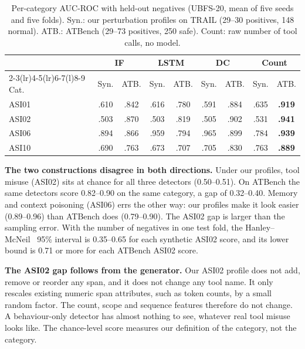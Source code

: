 \documentclass[conference]{IEEEtran}
\begin{document}
\begin{table}[t]
\caption{Per-category AUC-ROC with held-out negatives (UBFS-20, mean of five seeds and five folds). Syn.: our perturbation profiles on TRAIL (29--30 positives, 148 normal). ATB.: ATBench (29--73 positives, 250 safe). Count: raw number of tool calls, no model.}
\label{tab:construction}
\centering
\footnotesize
\setlength{\tabcolsep}{3pt}
\begin{tabular}{@{}l cc cc cc cc@{}}
\toprule
& \multicolumn{2}{c}{IF} & \multicolumn{2}{c}{LSTM} & \multicolumn{2}{c}{DC} & \multicolumn{2}{c}{Count} \\
\cmidrule(lr){2-3}\cmidrule(lr){4-5}\cmidrule(lr){6-7}\cmidrule(l){8-9}
Cat. & Syn. & ATB. & Syn. & ATB. & Syn. & ATB. & Syn. & ATB. \\
\midrule
ASI01 & .610 & .842 & .616 & .780 & .591 & .884 & .635 & \textbf{.919} \\
ASI02 & .503 & .870 & .503 & .819 & .505 & .902 & .531 & \textbf{.941} \\
ASI06 & .894 & .866 & .959 & .794 & .965 & .899 & .784 & \textbf{.939} \\
ASI10 & .690 & .763 & .673 & .707 & .705 & .830 & .763 & \textbf{.889} \\
\bottomrule
\end{tabular}
\end{table}

\textbf{The two constructions disagree in both directions.} Under our profiles, tool misuse (ASI02) sits at chance for all three detectors (0.50--0.51). On ATBench the same detectors score 0.82--0.90 on the same category, a gap of 0.32--0.40. Memory and context poisoning (ASI06) errs the other way: our profiles make it look easier (0.89--0.96) than ATBench does (0.79--0.90). The ASI02 gap is larger than the sampling error. With the number of negatives in one test fold, the Hanley--McNeil~\cite{hanley1982meaning} 95\% interval is 0.35--0.65 for each synthetic ASI02 score, and its lower bound is 0.71 or more for each ATBench ASI02 score.

\textbf{The ASI02 gap follows from the generator.} Our ASI02 profile does not add, remove or reorder any span, and it does not change any tool name. It only rescales existing numeric span attributes, such as token counts, by a small random factor. The count, scope and sequence features therefore do not change. A behaviour-only detector has almost nothing to see, whatever real tool misuse looks like. The chance-level score measures our definition of the category, not the category.
\end{document}
